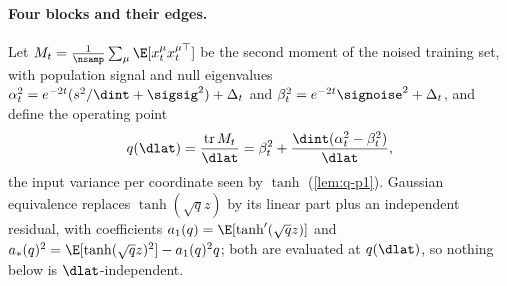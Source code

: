 \paragraph{Four blocks and their edges.}\label{sec:theory-fourbulk}
Let $M_t=\tfrac1\nsamp\sum_\mu\E[x^\mu_tx^{\mu\top}_t]$ be the second moment of the noised training set, with population signal and null eigenvalues $\alpha_t^2=e^{-2t}(s^2/\dint+\sigsig^2)+\Delta_t$ and $\beta_t^2=e^{-2t}\signoise^2+\Delta_t$, and define the operating point
\begin{equation}\label{eq:fourbulk-q-main}
q(\dlat)=\frac{\operatorname{tr}M_t}{\dlat}=\beta_t^2+\frac{\dint(\alpha_t^2-\beta_t^2)}{\dlat},
\end{equation}
the input variance per coordinate seen by $\tanh$ (\cref{lem:q-p1}). Gaussian equivalence replaces $\tanh(\sqrt q z)$ by its linear part plus an independent residual, with coefficients $a_1(q)=\E[\tanh'(\sqrt qz)]$ and $a_*(q)^2=\E[\tanh(\sqrt qz)^2]-a_1(q)^2q$; both are evaluated at $q(\dlat)$, so nothing below is $\dlat$-independent.

